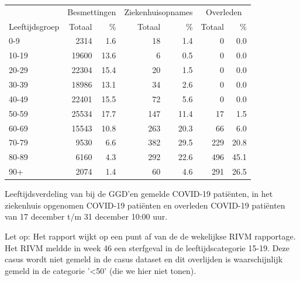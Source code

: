 \documentclass[
  english,
  man,floatsintext]{apa6}
\begin{document}
\begin{table}[H]
\centering\begingroup\fontsize{11}{13}\selectfont

\begin{threeparttable}
\begin{tabular}{lrrrrrr}
\toprule
\multicolumn{1}{c}{ } & \multicolumn{2}{c}{Besmettingen} & \multicolumn{2}{c}{Ziekenhuisopnames} & \multicolumn{2}{c}{Overleden} \\
\cmidrule(l{3pt}r{3pt}){2-3} \cmidrule(l{3pt}r{3pt}){4-5} \cmidrule(l{3pt}r{3pt}){6-7}
Leeftijdsgroep & Totaal & \% & Totaal & \% & Totaal & \%\\
\midrule
0-9 & 2314 & 1.6 & 18 & 1.4 & 0 & 0.0\\
10-19 & 19600 & 13.6 & 6 & 0.5 & 0 & 0.0\\
20-29 & 22304 & 15.4 & 20 & 1.5 & 0 & 0.0\\
30-39 & 18986 & 13.1 & 34 & 2.6 & 0 & 0.0\\
40-49 & 22401 & 15.5 & 72 & 5.6 & 0 & 0.0\\
50-59 & 25534 & 17.7 & 147 & 11.4 & 17 & 1.5\\
60-69 & 15543 & 10.8 & 263 & 20.3 & 66 & 6.0\\
70-79 & 9530 & 6.6 & 382 & 29.5 & 229 & 20.8\\
80-89 & 6160 & 4.3 & 292 & 22.6 & 496 & 45.1\\
90+ & 2074 & 1.4 & 60 & 4.6 & 291 & 26.5\\
\bottomrule
\end{tabular}
\begin{tablenotes}
\item[1] Leeftijdsverdeling van bij de GGD’en gemelde COVID-19 patiënten, in het ziekenhuis opgenomen COVID-19 patiënten en overleden COVID-19 patiënten van 17 december t/m 31 december 10:00 uur.
\item[2] Let op: Het rapport wijkt op een punt af van de de wekelijkse RIVM rapportage. Het RIVM meldde in week 46 een sterfgeval in de leeftijdscategorie 15-19. Deze casus wordt niet gemeld in de casus dataset en dit overlijden is waarschijnlijk gemeld in de categorie '<50' (die we hier niet tonen).
\end{tablenotes}
\end{threeparttable}
\endgroup{}
\end{table}

\newpage
\end{document}
